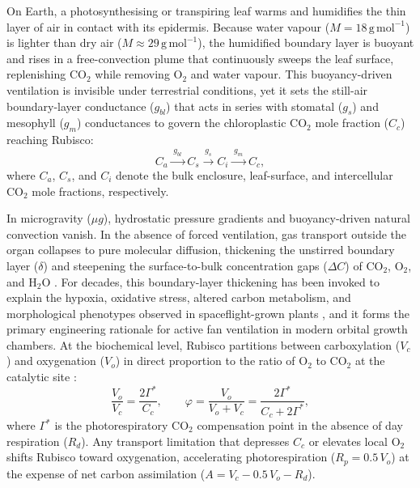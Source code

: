 \documentclass[preprint,11pt,numbers,sort&compress]{elsarticle}
\begin{document}
On Earth, a photosynthesising or transpiring leaf warms and humidifies the thin layer of air in contact with its epidermis. Because water vapour ($M = 18\,\mathrm{g\,mol^{-1}}$) is lighter than dry air ($M \approx 29\,\mathrm{g\,mol^{-1}}$), the humidified boundary layer is buoyant and rises in a free-convection plume that continuously sweeps the leaf surface, replenishing $\mathrm{CO_2}$ while removing $\mathrm{O_2}$ and water vapour. This buoyancy-driven ventilation is invisible under terrestrial conditions, yet it sets the still-air boundary-layer conductance ($g_{bl}$) that acts in series with stomatal ($g_s$) and mesophyll ($g_m$) conductances to govern the chloroplastic $\mathrm{CO_2}$ mole fraction ($C_c$) reaching Rubisco:
\begin{equation}
C_a \xrightarrow{\;g_{bl}\;} C_s \xrightarrow{\;g_s\;} C_i \xrightarrow{\;g_m\;} C_c ,
\label{eq:conductance_chain}
\end{equation}
where $C_a$, $C_s$, and $C_i$ denote the bulk enclosure, leaf-surface, and intercellular $\mathrm{CO_2}$ mole fractions, respectively.

In microgravity ($\mu g$), hydrostatic pressure gradients and buoyancy-driven natural convection vanish. In the absence of forced ventilation, gas transport outside the organ collapses to pure molecular diffusion, thickening the unstirred boundary layer ($\delta$) and steepening the surface-to-bulk concentration gaps ($\Delta C$) of $\mathrm{CO_2}$, $\mathrm{O_2}$, and $\mathrm{H_2O}$ \citep{porterfield2002,kitaya2003}. For decades, this boundary-layer thickening has been invoked to explain the hypoxia, oxidative stress, altered carbon metabolism, and morphological phenotypes observed in spaceflight-grown plants \citep{porterfield2002,correll2013,barker2023}, and it forms the primary engineering rationale for active fan ventilation in modern orbital growth chambers. At the biochemical level, Rubisco partitions between carboxylation ($V_c$) and oxygenation ($V_o$) in direct proportion to the ratio of $\mathrm{O_2}$ to $\mathrm{CO_2}$ at the catalytic site \citep{farquhar1980}:
\begin{equation}
\frac{V_o}{V_c} = \frac{2\Gamma^*}{C_c}, \qquad \varphi = \frac{V_o}{V_o + V_c} = \frac{2\Gamma^*}{C_c + 2\Gamma^*},
\label{eq:rubisco_partition}
\end{equation}
where $\Gamma^*$ is the photorespiratory $\mathrm{CO_2}$ compensation point in the absence of day respiration ($R_d$). Any transport limitation that depresses $C_c$ or elevates local $\mathrm{O_2}$ shifts Rubisco toward oxygenation, accelerating photorespiration ($R_p = 0.5\,V_o$) at the expense of net carbon assimilation ($A = V_c - 0.5\,V_o - R_d$).
\end{document}
